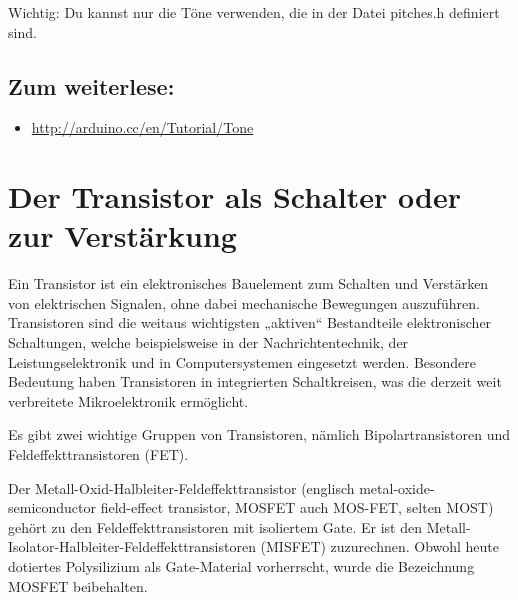 Wichtig: Du kannst nur die Töne verwenden, die in der Datei pitches.h definiert sind.

\subsection{Zum weiterlese:}
\begin{itemize}
\item \url{http://arduino.cc/en/Tutorial/Tone}
\end{itemize}

\section{Der Transistor als Schalter oder zur  Verstärkung}
Ein Transistor ist ein elektronisches Bauelement zum Schalten und Verstärken von elektrischen Signalen, ohne dabei mechanische Bewegungen auszuführen. Transistoren sind die weitaus wichtigsten „aktiven“ Bestandteile elektronischer Schaltungen, welche beispielsweise in der Nachrichtentechnik, der Leistungselektronik und in Computersystemen eingesetzt werden. Besondere Bedeutung haben Transistoren in integrierten Schaltkreisen, was die derzeit weit verbreitete Mikroelektronik ermöglicht.

Es gibt zwei wichtige Gruppen von Transistoren, nämlich Bipolartransistoren und Feldeffekttransistoren (FET).

Der Metall-Oxid-Halbleiter-Feldeffekttransistor (englisch metal-oxide-semiconductor field-effect transistor, MOSFET auch MOS-FET, selten MOST) gehört zu den Feldeffekttransistoren mit isoliertem Gate. Er ist den Metall-Isolator-Halbleiter-Feldeffekttransistoren (MISFET) zuzurechnen. Obwohl heute dotiertes Polysilizium als Gate-Material vorherrscht, wurde die Bezeichnung MOSFET beibehalten. 


